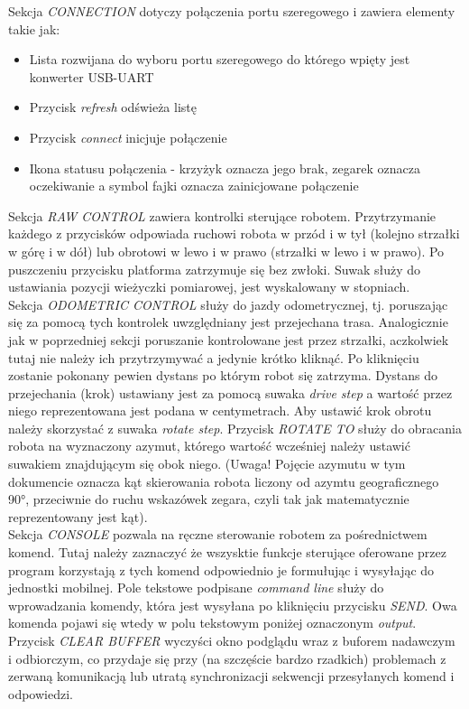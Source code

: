 Sekcja \emph{CONNECTION} dotyczy połączenia portu szeregowego i zawiera elementy takie jak:
\begin{itemize}
    \item Lista rozwijana do wyboru portu szeregowego do którego wpięty jest konwerter USB-UART
    \item Przycisk \emph{refresh} odświeża listę
    \item Przycisk \emph{connect} inicjuje połączenie
    \item Ikona statusu połączenia - krzyżyk oznacza jego brak, zegarek oznacza oczekiwanie a symbol fajki oznacza zainicjowane połączenie
\end{itemize}

Sekcja \emph{RAW CONTROL} zawiera kontrolki sterujące robotem. Przytrzymanie każdego z przycisków odpowiada ruchowi robota w przód i w tył (kolejno strzałki w górę i w dół) lub obrotowi w lewo i w prawo (strzałki w lewo i w prawo). Po puszczeniu przycisku platforma zatrzymuje się bez zwłoki. Suwak służy do ustawiania pozycji wieżyczki pomiarowej, jest wyskalowany w stopniach.
\\

Sekcja \emph{ODOMETRIC CONTROL} służy do jazdy odometrycznej, tj. poruszając się za pomocą tych kontrolek uwzględniany jest przejechana trasa. Analogicznie jak w poprzedniej sekcji poruszanie kontrolowane jest przez strzałki, aczkolwiek tutaj nie należy ich przytrzymywać a jedynie krótko kliknąć. Po kliknięciu zostanie pokonany pewien dystans po którym robot się zatrzyma. Dystans do przejechania (krok) ustawiany jest za pomocą suwaka \emph{drive step} a wartość przez niego reprezentowana jest podana w centymetrach. Aby ustawić krok obrotu należy skorzystać z suwaka \emph{rotate step}. Przycisk \emph{ROTATE TO} służy do obracania robota na wyznaczony azymut, którego wartość wcześniej należy ustawić suwakiem znajdującym się obok niego. (Uwaga! Pojęcie azymutu w tym dokumencie oznacza kąt skierowania robota liczony od azymtu geograficznego 90°, przeciwnie do ruchu wskazówek zegara, czyli tak jak matematycznie reprezentowany jest kąt).
\\

Sekcja \emph{CONSOLE} pozwala na ręczne sterowanie robotem za pośrednictwem komend. Tutaj należy zaznaczyć że wszysktie funkcje sterujące oferowane przez program korzystają z tych komend odpowiednio je formułując i wysyłając do jednostki mobilnej. Pole tekstowe podpisane \emph{command line} służy do wprowadzania komendy, która jest wysyłana po kliknięciu przycisku \emph{SEND}.
Owa komenda pojawi się wtedy w polu tekstowym poniżej oznaczonym \emph{output}. Przycisk \emph{CLEAR BUFFER} wyczyści okno podglądu wraz z buforem nadawczym i odbiorczym, co przydaje się przy (na szczęście bardzo rzadkich) problemach z zerwaną komunikacją lub utratą synchronizacji sekwencji przesyłanych komend i odpowiedzi.
\\

